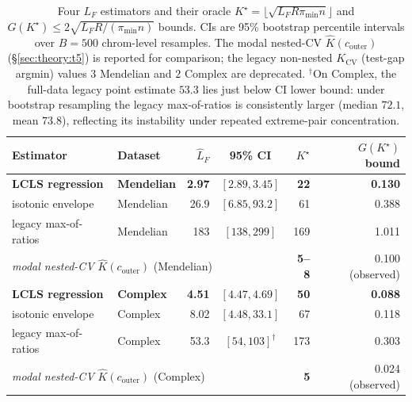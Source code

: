 \begin{table}[h]
\centering
\small
\caption{Four $L_F$ estimators and their oracle $K^\star = \lfloor\sqrt{L_F R \pi_{\min} n}\rfloor$ and $G(K^\star) \leq 2\sqrt{L_F R / (\pi_{\min} n)}$ bounds. CIs are 95\% bootstrap percentile intervals over $B = 500$ chrom-level resamples. The modal nested-CV $\hat K(c_{\mathrm{outer}})$ (§\ref{sec:theory:t5}) is reported for comparison; the legacy non-nested $K_{\mathrm{CV}}$ (test-gap argmin) values $3$ Mendelian and $2$ Complex are deprecated. $^\dagger$On Complex, the full-data legacy point estimate $53.3$ lies just below CI lower bound: under bootstrap resampling the legacy max-of-ratios is consistently larger (median $72.1$, mean $73.8$), reflecting its instability under repeated extreme-pair concentration.}
\label{tab:LF_estimators}
\begin{tabular}{llrcrr}
\toprule
Estimator & Dataset & $\hat L_F$ & 95\% CI & $K^\star$ & $G(K^\star)$ bound \\
\midrule
\textbf{LCLS regression} \citep{lcls2024lipschitz} & \textbf{Mendelian} & \textbf{2.97} & $[2.89, 3.45]$ & \textbf{22} & \textbf{0.130} \\
isotonic envelope          & Mendelian & 26.9 & $[6.85, 93.2]$ & 61   & 0.388 \\
legacy max-of-ratios       & Mendelian & 183  & $[138, 299]$ & 169  & 1.011 \\
\midrule
\multicolumn{4}{l}{\emph{modal nested-CV} $\hat K(c_{\mathrm{outer}})$ (Mendelian)} & \textbf{5--8} & 0.100 (observed) \\
\midrule
\textbf{LCLS regression} \citep{lcls2024lipschitz} & \textbf{Complex}  & \textbf{4.51} & $[4.47, 4.69]$ & \textbf{50} & \textbf{0.088} \\
isotonic envelope          & Complex   & 8.02 & $[4.48, 33.1]$ & 67  & 0.118 \\
legacy max-of-ratios       & Complex   & 53.3 & $[54, 103]^{\dagger}$ & 173  & 0.303 \\
\midrule
\multicolumn{4}{l}{\emph{modal nested-CV} $\hat K(c_{\mathrm{outer}})$ (Complex)}   & \textbf{5} & 0.024 (observed) \\
\bottomrule
\end{tabular}
\end{table}

